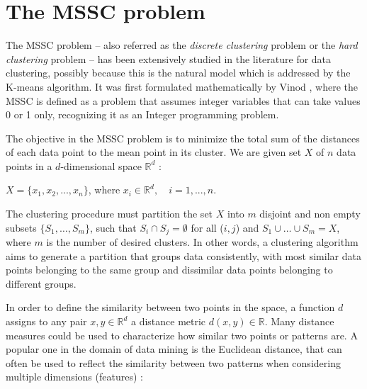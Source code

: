 \section{The MSSC problem}
The MSSC problem -- also referred as the \textit{discrete clustering} problem or the \textit{hard clustering} problem -- has been extensively studied in the literature for data clustering, possibly because this is the natural model which is addressed by the K-means algorithm. It was first formulated mathematically by Vinod \cite{Vinod1969}, where the MSSC is defined as a problem that assumes integer variables that can take values 0 or 1 only, recognizing it as an Integer programming problem.

The objective in the MSSC problem is to minimize the total sum of the distances of each data point to the mean point in its cluster. We are given set $X$ of $n$ data points in a $d$-dimensional space $\mathbb{R}^d$ \cite{Bagirov2006}:

\begin{center}%
$X = \{x_1, x_2, ..., x_n\}$, where $x_i \in \mathbb{R}^d, \quad i = 1, ..., n.$
\end{center}


The clustering procedure must partition the set $X$ into $m$ disjoint and non empty subsets $\{S_1,\dots,S_m\}$, such that $S_i \cap S_j = \emptyset$ for all ($i,j$) and $S_1 \cup \dots \cup S_m = X$, where $m$ is the number of desired clusters. In other words, a clustering algorithm aims to generate a partition that groups data consistently, with most similar data points belonging to the same group and dissimilar data points belonging to different groups.

In order to define the similarity between two points in the space, a function $d$ assigns to any pair $x, y \in \mathbb{R}^d$ a distance metric $d(x,y) \in \mathbb{R}$. Many distance measures could be used to characterize how similar two points or patterns are. A popular one in the domain of data mining is the Euclidean distance, that can often be used to reflect the similarity between two patterns when considering multiple dimensions (features) \cite{Jain1999}:

